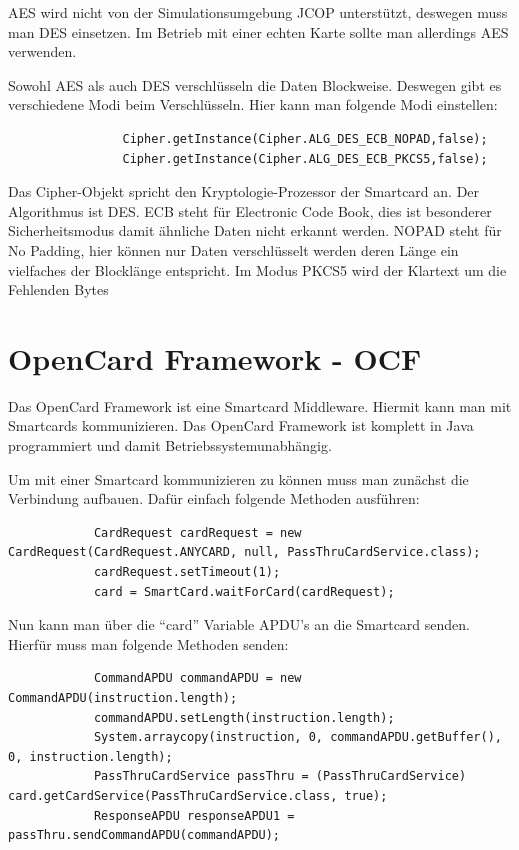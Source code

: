 \documentclass[parskip]{scrartcl}
\begin{document}
			AES wird nicht von der Simulationsumgebung JCOP unterstützt, deswegen muss man DES einsetzen. Im Betrieb mit einer echten Karte sollte man allerdings AES verwenden.
			
			Sowohl AES als auch DES verschlüsseln die Daten Blockweise. Deswegen gibt es verschiedene Modi beim Verschlüsseln. Hier kann man folgende Modi einstellen:
			
			\begin{lstlisting}
				Cipher.getInstance(Cipher.ALG_DES_ECB_NOPAD,false);
				Cipher.getInstance(Cipher.ALG_DES_ECB_PKCS5,false);
			\end{lstlisting}
			
			Das Cipher-Objekt spricht den Kryptologie-Prozessor der Smartcard an. Der Algorithmus ist DES. ECB steht für Electronic Code Book, dies ist besonderer Sicherheitsmodus damit ähnliche Daten nicht erkannt werden. NOPAD steht für No Padding, hier können nur Daten verschlüsselt werden deren Länge ein vielfaches der Blocklänge entspricht. Im Modus PKCS5 wird der Klartext um die Fehlenden Bytes 
				
	\section{OpenCard Framework - OCF}
		Das OpenCard Framework ist eine Smartcard Middleware. Hiermit kann man mit Smartcards kommunizieren. Das OpenCard Framework ist komplett in Java programmiert und damit Betriebssystemunabhängig.
		
		Um mit einer Smartcard kommunizieren zu können muss man zunächst die Verbindung aufbauen. Dafür einfach folgende Methoden ausführen:
		
		\begin{lstlisting}
			CardRequest cardRequest = new CardRequest(CardRequest.ANYCARD, null, PassThruCardService.class);
			cardRequest.setTimeout(1);
			card = SmartCard.waitForCard(cardRequest);
		\end{lstlisting}
		
		Nun kann man über die \enquote{card} Variable APDU's an die Smartcard senden. Hierfür muss man folgende Methoden senden:
		
		\begin{lstlisting}
			CommandAPDU commandAPDU = new CommandAPDU(instruction.length);
			commandAPDU.setLength(instruction.length);
			System.arraycopy(instruction, 0, commandAPDU.getBuffer(), 0, instruction.length);
			PassThruCardService passThru = (PassThruCardService) card.getCardService(PassThruCardService.class, true);
			ResponseAPDU responseAPDU1 = passThru.sendCommandAPDU(commandAPDU);
		\end{lstlisting}
		
\end{document}

